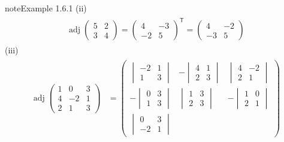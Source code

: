 \documentclass[letterpaper,10pt,english]{jupyterBook}
\begin{document}
\begin{sphinxadmonition}{note}{Example 1.6.1}
\sphinxAtStartPar
(ii)
\begin{equation*}
\begin{split} \begin{align*}
    \operatorname{adj}\begin{pmatrix} 5 & 2 \\ 3 & 4 \end{pmatrix} = \begin{pmatrix} 4 & -3 \\ -2 & 5 \end{pmatrix}^\mathsf{T}
= \begin{pmatrix} 4 & -2 \\ -3 & 5 \end{pmatrix}
\end{align*} \end{split}
\end{equation*}
\sphinxAtStartPar
(iii)
\begin{equation*}
\begin{split} \begin{align*}
    \operatorname{adj}\begin{pmatrix} 1 & 0 & 3 \\ 4 & -2 & 1 \\ 2 & 1 & 3 \end{pmatrix}
    &= \begin{pmatrix}
        \begin{vmatrix} -2 & 1 \\ 1 & 3 \end{vmatrix} &
        -\begin{vmatrix} 4 & 1 \\ 2 & 3 \end{vmatrix} &
        \begin{vmatrix} 4 & -2 \\ 2 & 1 \end{vmatrix} \\
        -\begin{vmatrix} 0 & 3 \\ 1 & 3 \end{vmatrix} &
        \begin{vmatrix} 1 & 3 \\ 2 & 3 \end{vmatrix} &
        -\begin{vmatrix} 1 & 0 \\ 2 & 1 \end{vmatrix} \\
        \begin{vmatrix} 0 & 3 \\ -2 & 1 \end{vmatrix} &

\end{pmatrix}
\end{align*}
\end{split}
\end{equation*}
\end{sphinxadmonition}
\end{document}
